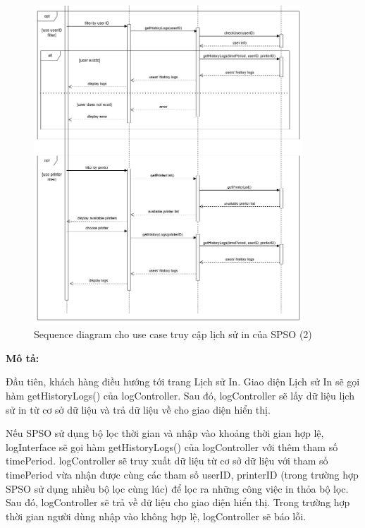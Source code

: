 \begin{figure}[H]
    \begin{center}
        \includegraphics[width=0.9\textwidth]{Images/System Modelling/Logging(SPSO)_Sequence(2).png}
        \caption{Sequence diagram cho use case truy cập lịch sử in của SPSO (2)}
        \label{fig:arch}
    \end{center}
\end{figure}

\textbf{Mô tả:}\par


Đầu tiên, khách hàng điều hướng tới trang Lịch sử In. Giao diện Lịch sử In sẽ gọi hàm getHistoryLogs() của logController. Sau đó, logController sẽ lấy dữ liệu lịch sử in từ cơ sở dữ liệu và trả dữ liệu về cho giao diện hiển thị.\par

Nếu SPSO sử dụng bộ lọc thời gian và nhập vào khoảng thời gian hợp lệ, logInterface sẽ gọi hàm getHistoryLogs() của logController với thêm tham số timePeriod. logController sẽ truy xuất dữ liệu từ cơ sở dữ liệu với tham số timePeriod vừa nhận được cùng các tham số userID, printerID (trong trường hợp SPSO sử dụng nhiều bộ lọc cùng lúc) để lọc ra những công việc in thỏa bộ lọc. Sau đó, logController sẽ trả về dữ liệu cho giao diện hiển thị. Trong trường hợp thời gian người dùng nhập vào không hợp lệ, logController sẽ báo lỗi.\par

